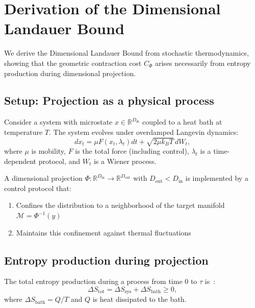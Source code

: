 \documentclass[aps,prx,twocolumn,superscriptaddress,floatfix]{revtex4-2}
\begin{document}
\section{Derivation of the Dimensional Landauer Bound}
\label{app:derivation}

We derive the Dimensional Landauer Bound from stochastic thermodynamics, showing that the geometric contraction cost $C_\Phi$ arises necessarily from entropy production during dimensional projection.

\subsection{Setup: Projection as a physical process}

Consider a system with microstate $x \in \mathbb{R}^{D_\mathrm{in}}$ coupled to a heat bath at temperature $T$. The system evolves under overdamped Langevin dynamics:
\begin{equation}
dx_t = \mu F(x_t, \lambda_t) dt + \sqrt{2\mu k_B T}\, dW_t,
\end{equation}
where $\mu$ is mobility, $F$ is the total force (including control), $\lambda_t$ is a time-dependent protocol, and $W_t$ is a Wiener process.

A dimensional projection $\Phi: \mathbb{R}^{D_\mathrm{in}} \to \mathbb{R}^{D_\mathrm{out}}$ with $D_\mathrm{out} < D_\mathrm{in}$ is implemented by a control protocol that:
\begin{enumerate}
\item Confines the distribution to a neighborhood of the target manifold $\mathcal{M} = \Phi^{-1}(y)$
\item Maintains this confinement against thermal fluctuations
\end{enumerate}

\subsection{Entropy production during projection}

The total entropy production during a process from time $0$ to $\tau$ is~\cite{seifert2012}:
\begin{equation}
\Delta S_\mathrm{tot} = \Delta S_\mathrm{sys} + \Delta S_\mathrm{bath} \geq 0,
\end{equation}
where $\Delta S_\mathrm{bath} = Q/T$ and $Q$ is heat dissipated to the bath.
\end{document}
